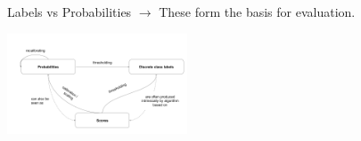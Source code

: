 \documentclass[11pt,compress,t,notes=noshow, xcolor=table]{beamer}
\begin{document}
\begin{vbframe}{Labels vs Probabilities}
$\rightarrow$ These form the basis for evaluation.

\vfill

  \includegraphics[width = 0.4\textwidth]{figure_man/classif_thresholding.png}


\end{vbframe}

\end{document}

